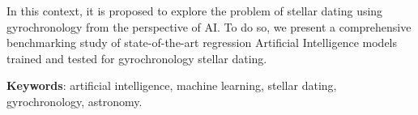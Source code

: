 In this context, it is proposed to explore the problem of stellar dating using gyrochronology from the perspective of AI. To do so, we present a comprehensive benchmarking study of state-of-the-art regression Artificial Intelligence models trained and tested for gyrochronology stellar dating. 

\vspace{1cm}

\textbf{Keywords}: artificial intelligence, machine learning, stellar dating, gyrochronology, astronomy.


\newpage
\thispagestyle{empty}
\hspace*{0.5cm}
\newpage
